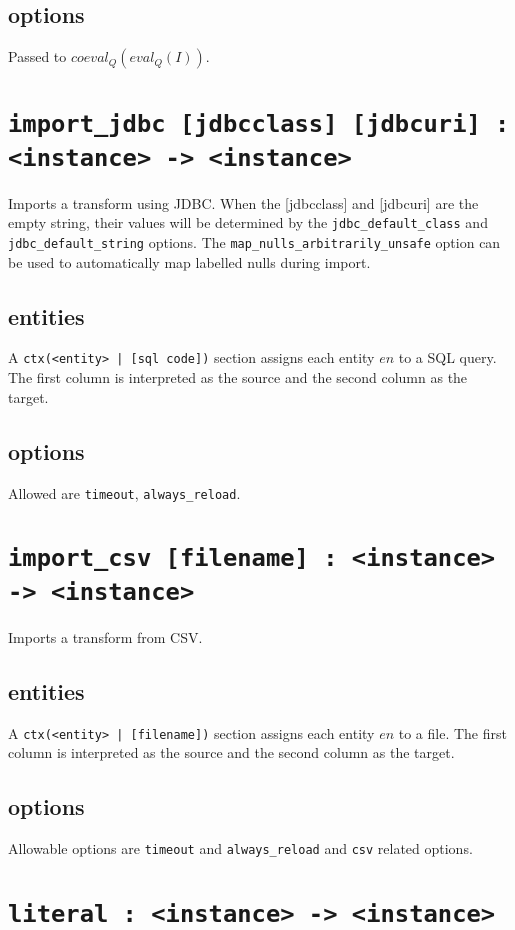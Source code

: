 \documentclass[10pt]{book}
\begin{document}
\subsection{options}
Passed to $coeval_Q(eval_Q(I))$.

\section{{\tt import\_jdbc  [jdbcclass] [jdbcuri] : <instance> -> <instance>}}
Imports a transform using JDBC. When the [jdbcclass] and [jdbcuri] are the empty string, their values will be determined by the {\tt jdbc\_default\_class} and {\tt jdbc\_default\_string} options.  The {\tt map\_nulls\_arbitrarily\_unsafe} option can be used to automatically map labelled nulls during import.

\subsection{entities}
A {\tt ctx(<entity> | [sql code])} section assigns each entity $en$ to a SQL query.  The first column is interpreted as the source and the second column as the target.

\subsection{options}
Allowed are {\tt timeout}, {\tt always\_reload}.  

\section{{\tt import\_csv [filename] : <instance> -> <instance>}} 

Imports a transform from CSV.  

\subsection{entities}
A {\tt ctx(<entity> | [filename])} section assigns each entity $en$ to a file.  The first column is interpreted as the source and the second column as the target.


\subsection{options}
Allowable options are {\tt timeout} and {\tt always\_reload}  and {\tt csv} related options. 

\section{{\tt literal : <instance> -> <instance>}}
\end{document}

